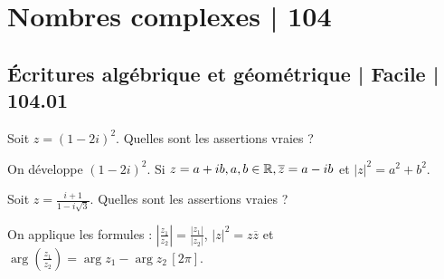 



\section{Nombres complexes | 104}


\subsection{Écritures algébrique et géométrique | Facile | 104.01}

\begin{question} 
Soit $z=(1-2i)^2$. Quelles sont les assertions vraies ?
\begin{answers}



\end{answers}
\begin{explanations}
On développe $(1-2i)^2$. Si $z=a+ib, a,b \in \mathbb{R}, \overline{z}=a-ib$  et $|z|^2= a^2+b^2$. 
\end{explanations}

\end{question}


\begin{question} 
Soit $z=\frac{i+1}{1-i\sqrt 3}$. Quelles sont les assertions vraies ?
\begin{answers}
    



    
\end{answers}
\begin{explanations}
On applique les formules :
$|\frac{z_1}{z_2}|= \frac{|z_1|}{|z_2|}$, $|z|^2=z\overline{z}$ et $\arg(\frac{z_1}{z_2})= \arg z_1 - \arg z_2 \, [2\pi]$. 

\end{explanations}

\end{question}



